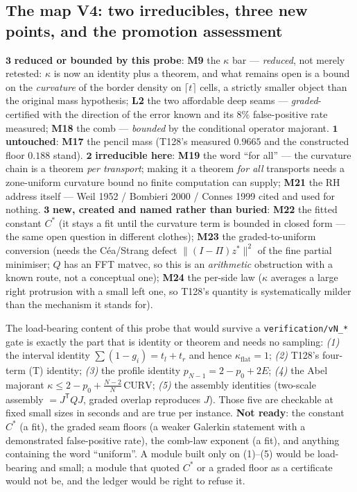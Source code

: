 \documentclass[11pt,a4paper]{article}
\begin{document}
\subsection{The map V4: two irreducibles, three new points, and the promotion assessment}
\begin{keybox}
$\mathbf{3}$ \textbf{reduced or bounded by this probe}: \textbf{M9} the $\kappa$ bar ---
\emph{reduced}, not merely retested: $\kappa$ is now an identity plus a theorem, and what
remains open is a bound on the \emph{curvature} of the border density on $\lceil t\rceil$
cells, a strictly smaller object than the original mass hypothesis; \textbf{L2} the two
affordable deep seams --- \emph{graded}-certified with the direction of the error known and
its $8\%$ false-positive rate measured; \textbf{M18} the comb --- \emph{bounded} by the
conditional operator majorant. $\mathbf{1}$ \textbf{untouched}: \textbf{M17} the pencil mass
(T128's measured $0.9665$ and the constructed floor $0.188$ stand). $\mathbf{2}$
\textbf{irreducible here}: \textbf{M19} the word ``for all'' --- the curvature chain is a
theorem \emph{per transport}; making it a theorem \emph{for all} transports needs a
zone-uniform curvature bound no finite computation can supply; \textbf{M21} the RH address
itself --- Weil 1952 / Bombieri 2000 / Connes 1999 cited and used for nothing.
$\mathbf{3}$ \textbf{new, created and named rather than buried}: \textbf{M22} the fitted
constant $C^*$ (it stays a fit until the curvature term is bounded in closed form --- the same
open question in different clothes); \textbf{M23} the graded-to-uniform conversion (needs the
C\'ea/Strang defect $\|(I-\Pi)z^*\|^2$ of the fine partial minimiser; $Q$ has an FFT matvec,
so this is an \emph{arithmetic} obstruction with a known route, not a conceptual one);
\textbf{M24} the per-side law ($\kappa$ averages a large right protrusion with a small left
one, so T128's quantity is systematically milder than the mechanism it stands for).
\end{keybox}

\begin{keybox}
The load-bearing content of this probe that would survive a \texttt{verification/vN\_*} gate
is exactly the part that is identity or theorem and needs no sampling: \emph{(1)} the interval
identity $\sum(1-g_i)=t_l+t_r$ and hence $\kappa_{\mathrm{flat}}=1$; \emph{(2)} T128's
four-term (T) identity; \emph{(3)} the profile identity $p_{N-1}=2-p_0+2E$; \emph{(4)} the
Abel majorant $\kappa\le2-p_0+\frac{N-2}{N}\,\mathrm{CURV}$; \emph{(5)} the assembly
identities (two-scale assembly $=J^{\mathsf T}QJ$, graded overlap reproduces $J$). Those five
are checkable at fixed small sizes in seconds and are true per instance. \textbf{Not ready}:
the constant $C^*$ (a fit), the graded seam floors (a weaker Galerkin statement with a
demonstrated false-positive rate), the comb-law exponent (a fit), and anything containing the
word ``uniform''. A module built only on (1)--(5) would be load-bearing and small; a module
that quoted $C^*$ or a graded floor as a certificate would not be, and the ledger would be
right to refuse it.
\end{keybox}
\end{document}
